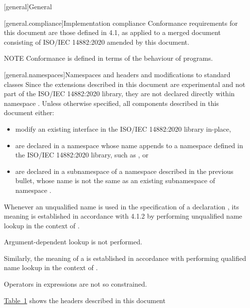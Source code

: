 [general]{General}

[general.compliance]{Implementation compliance}
Conformance requirements for this document are those defined in 4.1, as applied to a merged document consisting of ISO/IEC 14882:2020 amended by this document.

NOTE Conformance is defined in terms of the behaviour of programs.%

[general.namespaces]{Namespaces and headers and modifications to standard classes}
Since the extensions described in this document are experimental and not part of the ISO/IEC 14882:2020 library, they are not declared directly within namespace . Unless otherwise specified, all components described in this document either:

\begin{itemize}
    \item modify an existing interface in the ISO/IEC 14882:2020 library in-place,
    \item are declared in a namespace whose name appends  to a namespace defined in the ISO/IEC 14882:2020 library, such as , or
    \item are declared in a subnamespace of a namespace described in the previous bullet, whose name is not the same as an existing subnamespace of namespace .
\end{itemize}

Whenever an unqualified name is used
in the specification of a declaration ,
its meaning is established
in accordance with 4.1.2 by performing unqualified name lookup
in the context of .
\begin{note}
Argument-dependent lookup is not performed.\end{note}
Similarly, the meaning of a  is established
in accordance with performing qualified name lookup
in the context of .
\begin{note}
Operators in expressions are not so constrained.\end{note}

\hyperref[tab:C++ library headers]{Table~1} shows the headers described in this document

